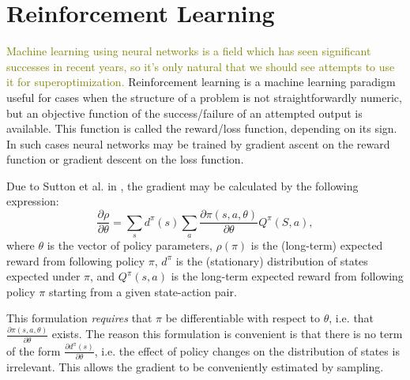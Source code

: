 \documentclass[12pt,twoside]{reedthesis}
\newcommand{\green}[1]{\textcolor{olive}{#1}}
\begin{document}

    \section{Reinforcement Learning}
        \green{
        Machine learning using neural networks is a field which has seen significant successes in recent years, so it's only natural that we should see attempts to use it for superoptimization. 
        }
        Reinforcement learning is a machine learning paradigm useful for cases when the structure of a problem is not straightforwardly numeric, but an objective function of the success/failure of an attempted output is available.
        This function is called the reward/loss function, depending on its sign. In such cases neural networks may be trained by gradient ascent on the reward function or gradient descent on the loss function.
        
        Due to Sutton et al. in \cite{sutton1999policygradient}, the gradient may be calculated by the following expression:
        \[
            \frac{\partial \rho}{\partial \theta} = \sum_s d^\pi(s) \sum_a \frac{\partial \pi(s,a, \theta)}{\partial \theta}Q^\pi(S,a),
        \]
        where $\theta$ is the vector of policy parameters, $\rho(\pi)$ is the (long-term) expected reward from following policy $\pi$, $d^\pi$ is the (stationary) distribution of states expected under $\pi$, and $Q^\pi(s,a)$ is the long-term expected reward from following policy $\pi$ starting from a given state-action pair.
        
        This formulation \textit{requires} that $\pi$ be differentiable with respect to $\theta$, i.e. that $\frac{\partial \pi(s,a, \theta)}{\partial \theta}$ exists.
        The reason this formulation is convenient is that there is no term of the form $\frac{\partial d^\pi(s)}{\partial \theta}$, i.e. the effect of policy changes on the distribution of states is irrelevant.
        This allows the gradient to be conveniently estimated by sampling.

\end{document}

